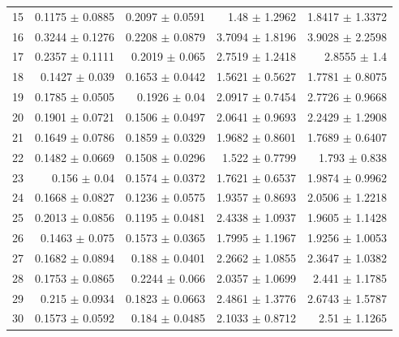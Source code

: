 \begin{table}[ht]
\begin{tabular}{lrrrr}
  15 & 0.1175 $\pm$ 0.0885 & 0.2097 $\pm$ 0.0591 & 1.48 $\pm$ 1.2962 & 1.8417 $\pm$ 1.3372 \\ 
  16 & 0.3244 $\pm$ 0.1276 & 0.2208 $\pm$ 0.0879 & 3.7094 $\pm$ 1.8196 & 3.9028 $\pm$ 2.2598 \\ 
  17 & 0.2357 $\pm$ 0.1111 & 0.2019 $\pm$ 0.065 & 2.7519 $\pm$ 1.2418 & 2.8555 $\pm$ 1.4 \\ 
  18 & 0.1427 $\pm$ 0.039 & 0.1653 $\pm$ 0.0442 & 1.5621 $\pm$ 0.5627 & 1.7781 $\pm$ 0.8075 \\ 
  19 & 0.1785 $\pm$ 0.0505 & 0.1926 $\pm$ 0.04 & 2.0917 $\pm$ 0.7454 & 2.7726 $\pm$ 0.9668 \\ 
  20 & 0.1901 $\pm$ 0.0721 & 0.1506 $\pm$ 0.0497 & 2.0641 $\pm$ 0.9693 & 2.2429 $\pm$ 1.2908 \\ 
  21 & 0.1649 $\pm$ 0.0786 & 0.1859 $\pm$ 0.0329 & 1.9682 $\pm$ 0.8601 & 1.7689 $\pm$ 0.6407 \\ 
  22 & 0.1482 $\pm$ 0.0669 & 0.1508 $\pm$ 0.0296 & 1.522 $\pm$ 0.7799 & 1.793 $\pm$ 0.838 \\ 
  23 & 0.156 $\pm$ 0.04 & 0.1574 $\pm$ 0.0372 & 1.7621 $\pm$ 0.6537 & 1.9874 $\pm$ 0.9962 \\ 
  24 & 0.1668 $\pm$ 0.0827 & 0.1236 $\pm$ 0.0575 & 1.9357 $\pm$ 0.8693 & 2.0506 $\pm$ 1.2218 \\ 
  25 & 0.2013 $\pm$ 0.0856 & 0.1195 $\pm$ 0.0481 & 2.4338 $\pm$ 1.0937 & 1.9605 $\pm$ 1.1428 \\ 
  26 & 0.1463 $\pm$ 0.075 & 0.1573 $\pm$ 0.0365 & 1.7995 $\pm$ 1.1967 & 1.9256 $\pm$ 1.0053 \\ 
  27 & 0.1682 $\pm$ 0.0894 & 0.188 $\pm$ 0.0401 & 2.2662 $\pm$ 1.0855 & 2.3647 $\pm$ 1.0382 \\ 
  28 & 0.1753 $\pm$ 0.0865 & 0.2244 $\pm$ 0.066 & 2.0357 $\pm$ 1.0699 & 2.441 $\pm$ 1.1785 \\ 
  29 & 0.215 $\pm$ 0.0934 & 0.1823 $\pm$ 0.0663 & 2.4861 $\pm$ 1.3776 & 2.6743 $\pm$ 1.5787 \\ 
  30 & 0.1573 $\pm$ 0.0592 & 0.184 $\pm$ 0.0485 & 2.1033 $\pm$ 0.8712 & 2.51 $\pm$ 1.1265 \\ 
   \bottomrule
\end{tabular}
\label{tab:summary_table_all_variables}
\end{table}


